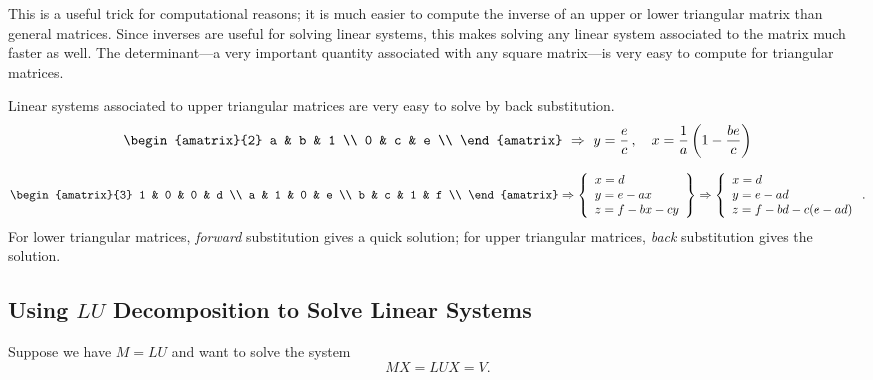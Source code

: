 This is a useful trick for  computational reasons; it is much easier to compute the inverse of an upper or lower triangular matrix than general matrices.  Since inverses are useful for solving linear systems, this makes solving any linear system associated to the matrix much faster as well.  The determinant---a very important quantity associated with any square matrix---is very easy to compute for triangular matrices.

\begin{example}
Linear systems associated to upper triangular matrices are very easy to solve by back substitution.
\[
\begin{amatrix}{2}
a & b & 1 \\
0 & c & e \\
\end{amatrix} \ \Rightarrow \ y=\frac{e}{c}\, , \quad x=\frac{1}{a}\left(1-\frac{be}{c}\right)
\]

$$
\begin{amatrix}{3}
1 & 0 & 0 & d \\
a & 1 & 0 & e \\
b & c & 1 & f \\
\end{amatrix} 
\Rightarrow 
\left\{    \begin{array}{l} x=d\\   y=e-ax\\  z=f-bx-cy \end{array} \right\}
\Rightarrow 
\left\{    \begin{array}{l} x=d\\   y=e-ad\\  z=f-bd-c(e-ad) \end{array} \right. .
$$
For lower triangular matrices, 
\emph{forward} substitution 
gives a quick solution; for upper triangular matrices, 
\emph{back} substitution 
gives the solution.
\end{example}





\subsection{Using $LU$ Decomposition to Solve Linear Systems}

Suppose we have $M=LU$ and want to solve the system
\[
MX=LUX=V.
\]

